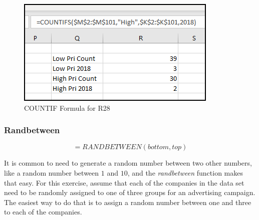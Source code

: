 \begin{enumerate}
	\begin{figure}[H]
		\centering
		\includegraphics[width=\maxwidth{.95\linewidth}]{gfx/ch09_fig43}
		\caption{COUNTIF Formula for R28}
		\label{09:fig43}
	\end{figure}
		
\end{enumerate}

\subsubsection{Randbetween}

\[ =RANDBETWEEN(bottom, top) \]

It is common to need to generate a random number between two other numbers, like a random number between $ 1 $ and $ 10 $, and the \textit{randbetween} function makes that easy. For this exercise, assume that each of the companies in the data set need to be randomly assigned to one of  three groups for an advertising campaign. The easiest way to do that is to assign a random number between one and three to each of the companies.

